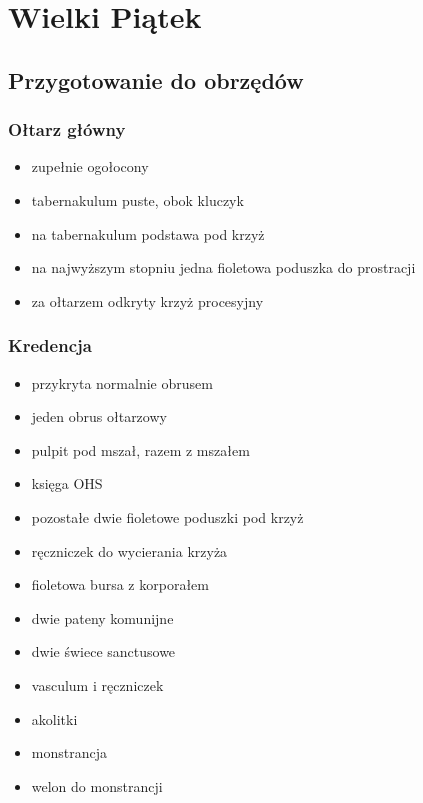 \chapter{Wielki Piątek}

\section{Przygotowanie do obrzędów}
    
        \subsection{Ołtarz główny}
        
            \begin{itemize}
                \item zupełnie ogołocony
                \item tabernakulum puste, obok kluczyk
                \item na tabernakulum podstawa pod krzyż
                \item na najwyższym stopniu jedna fioletowa poduszka do prostracji
                \item za ołtarzem odkryty krzyż procesyjny
            \end{itemize}
        
        \subsection{Kredencja}
        
            \begin{itemize}
                \item przykryta normalnie obrusem
                \item jeden obrus ołtarzowy
                \item pulpit pod mszał, razem z mszałem
                \item księga OHS
                \item pozostałe dwie fioletowe poduszki pod krzyż
                \item ręczniczek do wycierania krzyża
                \item fioletowa bursa z korporałem
                \item dwie pateny komunijne
                \item dwie świece sanctusowe
                \item vasculum i ręczniczek
                \item akolitki
                \item monstrancja
                \item welon do monstrancji
            \end{itemize}
        
